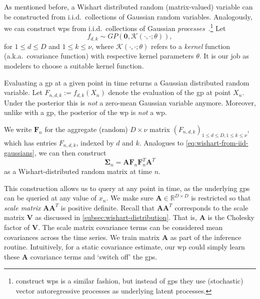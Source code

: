 As mentioned before, a Wishart distributed random (matrix-valued) variable can be constructed from i.i.d.\ collections of Gaussian random variables.
Analogously, we can construct \glspl{wp} from i.i.d.~collections of Gaussian \emph{processes}~\parencite{Rasmussen2006}.\footnote{\textcite{Gourieroux2009} construct \glspl{wp} is a similar fashion, but instead of \glspl{gp} they use (stochastic) vector autoregressive processes as underlying latent processes.}
Let
\begin{equation}
  f_{d,k} \sim GP(\textbf{0}, \mathcal{K}(\cdot, \cdot ; \theta)),
\end{equation}
for $1 \leq d \leq D$ and $1 \leq k \leq \nu$, where $\mathcal{K}(\cdot, \cdot ; \theta)$ refers to a \emph{kernel} function (a.k.a.~covariance function) with respective kernel parameters $\theta$.
It is our job as modelers to choose a suitable kernel function.

Evaluating a \gls{gp} at a given point in time returns a Gaussian distributed random variable.
Let $F_{n,d,k} := f_{d,k}(X_n)$ denote the evaluation of the \gls{gp} at point $X_n$.
Under the posterior this is \emph{not} a zero-mean Gaussian variable anymore.
Moreover, unlike with a \gls{gp}, the posterior of the \gls{wp} is \emph{not} a \gls{wp}.

We write $\mathbf{F}_n$ for the aggregate (random) $D \times \nu$ matrix $(F_{n,d,k})_{1\leq d\leq D,1\leq k\leq \nu}$, which has entries $F_{n,d,k}$, indexed by $d$ and $k$.
Analogues to \cref{eq:wishart-from-iid-gaussians}, we can then construct
\begin{equation}
\label{eq:sigma-definition}
  \mathbf{\Sigma}_n = \mathbf{A} \mathbf{F}_n \mathbf{F}_n^T \mathbf{A}^T
\end{equation}
as a Wishart-distributed random matrix at time $n$.

This construction allows us to query at any point in time, as the underlying \glspl{gp} can be queried at any value of $x_n$.
We make sure $\mathbf{A} \in \mathbb{R}^{D \times D}$ is restricted so that \emph{scale matrix} $\mathbf{A}\mathbf{A}^T$ is positive definite.
Recall that $\mathbf{A}\mathbf{A}^T$ corresponds to the scale matrix $\mathbf{V}$ as discussed in \cref{subsec:wishart-distribution}.
That is, $\mathbf{A}$ is the Cholesky factor of $\mathbf{V}$.
The scale matrix covariance terms can be considered mean covariances across the time series.
We train matrix $\mathbf{A}$ as part of the inference routine.
Intuitively, for a static covariance estimate, our \gls{wp} could simply learn these $\mathbf{A}$ covariance terms and `switch off' the \glspl{gp}.

